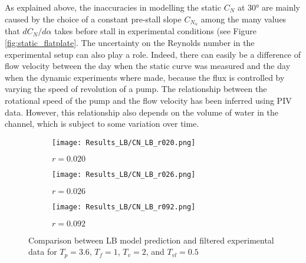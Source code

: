 As explained above, the inaccuracies in modelling the static $C_N$ at $\ang{30}$ are mainly caused by the choice of a constant pre-stall slope $C_{N_\alpha}$ among the many values that $dC_N/d\alpha$ takes before stall in experimental conditions (see Figure \ref{fig:static_flatplate}. The uncertainty on the Reynolds number in the experimental setup can also play a role. Indeed, there can easily be a difference of flow velocity between the day when the static curve was measured and the day when the dynamic experiments where made, because the flux is controlled by varying the speed of revolution of a pump. The relationship between the rotational speed of the pump and the flow velocity has been inferred using PIV data. However, this relationship also depends on the volume of water in the channel, which is subject to some variation over time.    

\begin{figure}[h]
    \begin{subfigure}{\textwidth}
        \centering
        \texttt{[image: Results\_LB/CN\_LB\_r020.png]}
        \caption{$r = 0.020$}
        \label{fig:CN_LB_r020}
    \end{subfigure}
    \begin{subfigure}{\textwidth}
        \centering
        \texttt{[image: Results\_LB/CN\_LB\_r026.png]}
        \caption{$r = 0.026$}
        \label{fig:CN_LB_r026}
    \end{subfigure}
    \begin{subfigure}{\textwidth}
        \centering
        \texttt{[image: Results\_LB/CN\_LB\_r092.png]}
        \caption{$r = 0.092$}
        \label{fig:CN_LB_r092}
    \end{subfigure}
    \caption{Comparison between LB model prediction and filtered experimental data for $T_p=3.6$, $T_f=1$, $T_v=2$, and $T_{vl}=0.5$}
    \label{fig:CN_LB}
\end{figure}

\iffalse
The use of different values for $C_{N_\alpha}$ in the computation of the circulatory lift $C_N^C$ (Equation \eqref{eq:circulatory}), the separated effective angle of attack $\alpha_f$ (Equation \eqref{eq:separated_effective_alpha}), and the modified Kirchhoff force $C_N^f$ (Equation \eqref{eq:mod_kirchhoff}) leads to inconsistencies in the separation curves. At steady-state, all separation locations $f$, $f'$, and $f''$ should take the same value, slightly above the one when the boundary layer is fully separated $f_\infty$. Figure \ref{fig:f_LB} shows opposite, due to $C_{N_\alpha}$ not being equal in Equations \eqref{eq:separated_effective_alpha} \& \eqref{eq:mod_kirchhoff}.
\fi

